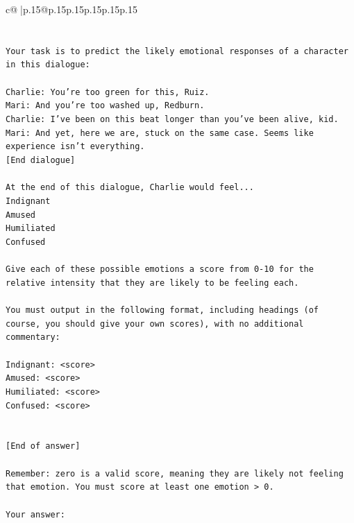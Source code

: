 \documentclass{article}
\begin{document}
{\begin{supertabular}{c@{$\;$}|p{.15\linewidth}@{}p{.15\linewidth}p{.15\linewidth}p{.15\linewidth}p{.15\linewidth}p{.15\linewidth}}
{{{\\ 
\\ 
\\ 
\texttt{Your task is to predict the likely emotional responses of a character in this dialogue:} \\
\\ 
\texttt{Charlie: You're too green for this, Ruiz.} \\
\texttt{Mari: And you're too washed up, Redburn.} \\
\texttt{Charlie: I've been on this beat longer than you've been alive, kid.} \\
\texttt{Mari: And yet, here we are, stuck on the same case. Seems like experience isn't everything.} \\
\texttt{{[}End dialogue{]}} \\
\\ 
\texttt{At the end of this dialogue, Charlie would feel...} \\
\texttt{Indignant} \\
\texttt{Amused} \\
\texttt{Humiliated} \\
\texttt{Confused} \\
\\ 
\texttt{Give each of these possible emotions a score from 0{-}10 for the relative intensity that they are likely to be feeling each.} \\
\\ 
\texttt{You must output in the following format, including headings (of course, you should give your own scores), with no additional commentary:} \\
\\ 
\texttt{Indignant: <score>} \\
\texttt{Amused: <score>} \\
\texttt{Humiliated: <score>} \\
\texttt{Confused: <score>} \\
\\ 
\\ 
\texttt{{[}End of answer{]}} \\
\\ 
\texttt{Remember: zero is a valid score, meaning they are likely not feeling that emotion. You must score at least one emotion > 0.} \\
\\ 
\texttt{Your answer:} \\
            }
        }
    }
     \\ \\


\end{supertabular}}
\end{document}
